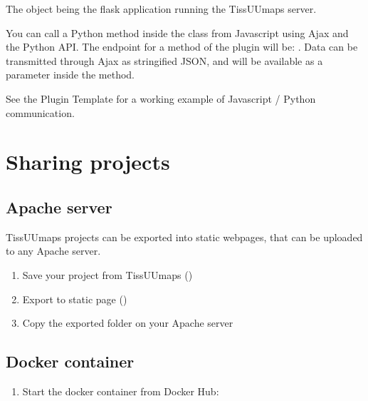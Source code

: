 \documentclass[letterpaper,10pt,english,openany,oneside]{sphinxmanual}
\begin{document}
\sphinxAtStartPar
The  object being the flask application running the TissUUmaps server.

\sphinxAtStartPar
You can call a Python method inside the  class from Javascript using Ajax and the Python API. The endpoint for a method  of the plugin  will be: . Data can be transmitted through Ajax as stringified JSON, and will be available as a parameter inside the method.

\sphinxAtStartPar
See the Plugin Template for a working example of Javascript / Python communication.

\sphinxstepscope


\chapter{Sharing projects}
\label{\detokenize{docs/sharing/index:sharing-projects}}\label{\detokenize{docs/sharing/index::doc}}
\sphinxstepscope


\section{Apache server}
\label{\detokenize{docs/sharing/apache:apache-server}}\label{\detokenize{docs/sharing/apache::doc}}
\sphinxAtStartPar
TissUUmaps projects can be exported into static webpages, that can be uploaded to any Apache server.
\begin{enumerate}
%
\item {} 
\sphinxAtStartPar
Save your project from TissUUmaps ()

\item {} 
\sphinxAtStartPar
Export to static page ()

\item {} 
\sphinxAtStartPar
Copy the exported folder on your Apache server

\end{enumerate}

\sphinxstepscope


\section{Docker container}
\label{\detokenize{docs/sharing/docker:docker-container}}\label{\detokenize{docs/sharing/docker::doc}}\begin{enumerate}
%
\item {} 
\sphinxAtStartPar
Start the docker container  from Docker Hub:

\end{enumerate}
\end{document}
